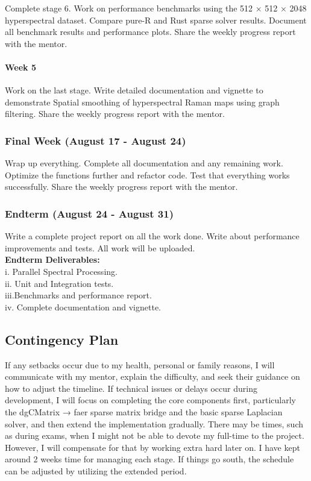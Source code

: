 \documentclass[11pt]{article}
\begin{document}
\hfill\break
Complete stage 6. Work on performance benchmarks using the 512 × 512 ×
2048 hyperspectral dataset. Compare pure-R and Rust sparse solver
results. Document all benchmark results and performance plots. Share the
weekly progress report with the mentor.

\hypertarget{week-5-1}{%
\paragraph{Week 5}\label{week-5-1}}

\hfill\break
Work on the last stage. Write detailed documentation and vignette to
demonstrate Spatial smoothing of hyperspectral Raman maps using graph
filtering. Share the weekly progress report with the mentor.

\hypertarget{final-week-august-17---august-24}{%
\subsubsection{Final Week (August 17 - August
24)}\label{final-week-august-17---august-24}}

Wrap up everything. Complete all documentation and any remaining work.
Optimize the functions further and refactor code. Test that everything
works successfully. Share the weekly progress report with the mentor.

\hypertarget{endterm-august-24---august-31}{%
\subsubsection{Endterm (August 24 - August
31)}\label{endterm-august-24---august-31}}

Write a complete project report on all the work done. Write about
performance improvements and tests. All work will be uploaded.\\
\textbf{Endterm Deliverables:}\\
i. Parallel Spectral Processing.\\
ii. Unit and Integration tests.\\
iii.Benchmarks and performance report.\\
iv. Complete documentation and vignette.

\hypertarget{contingency-plan}{%
\subsection{Contingency Plan}\label{contingency-plan}}

If any setbacks occur due to my health, personal or family reasons, I
will communicate with my mentor, explain the difficulty, and seek their
guidance on how to adjust the timeline. If technical issues or delays
occur during development, I will focus on completing the core components
first, particularly the dgCMatrix → faer sparse matrix bridge and the
basic sparse Laplacian solver, and then extend the implementation
gradually. There may be times, such as during exams, when I might not be
able to devote my full-time to the project. However, I will compensate
for that by working extra hard later on. I have kept around 2 weeks time
for managing each stage. If things go south, the schedule can be
adjusted by utilizing the extended period.
\end{document}
